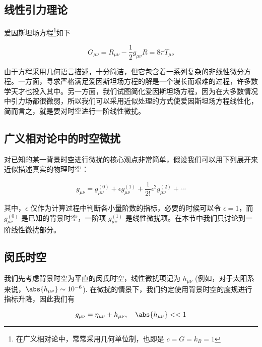 
\begin{issues}
\issueMissDepend
\issueDraft
\end{issues}



\subsection{线性引力理论}
爱因斯坦场方程\footnote{在广义相对论中，常常采用几何单位制，也即是 $c=G=k_B=1$}如下

\begin{equation}\label{LinGra_eq2}
G_{\mu \nu} = R_{\mu \nu} - \frac{1}{2}g_{\mu\nu}R = 8\pi T_{\mu\nu}
\end{equation}

由于方程采用几何语言描述，十分简洁，但它包含着一系列复杂的非线性微分方程。一方面，寻求严格满足爱因斯坦场方程的解是一个漫长而艰难的过程，许多数学天才也投入其中。另一方面，我们试图简化爱因斯坦场方程，因为在大多数情况中引力场都很微弱，所以我们可以采用近似处理的方式使爱因斯坦场方程线性化，简而言之，就是要对时空进行一阶线性微扰。


\subsection{广义相对论中的时空微扰}

对已知的某一背景时空进行微扰的核心观点非常简单，假设我们可以用下列展开来近似描述真实的物理时空：

\begin{equation}
g_{\mu\nu}=g^{(0)}_{\mu\nu} + \epsilon g^{(1)}_{\mu\nu} + \frac{1}{2!}\epsilon^2 g^{(2)}_{\mu\nu}+\cdots
\end{equation}

其中，$\epsilon $ 仅作为计算过程中判断各小量阶数的指标，必要的时候可以令 $\epsilon = 1 $，而 $g^{(0)}_{\mu\nu} $ 是已知的背景时空，一阶项 $g^{(1)}_{\mu\nu}$ 是线性微扰项。在本节中我们只讨论到一阶线性微扰部分。


\subsection{闵氏时空}

我们先考虑背景时空为平直的闵氏时空，线性微扰项记为 $h_{\mu\nu}$ (例如，对于太阳系来说，$\abs{h_{\mu\nu}} \sim 10^{-6}$). 在微扰的情景下，我们约定使用背景时空的度规进行指标升降，因此我们有

\begin{equation}
g_{\mu\nu} = \eta_{\mu\nu} + h_{\mu\nu}, \quad \abs{h_{\mu\nu}}<<1 
\end{equation}

